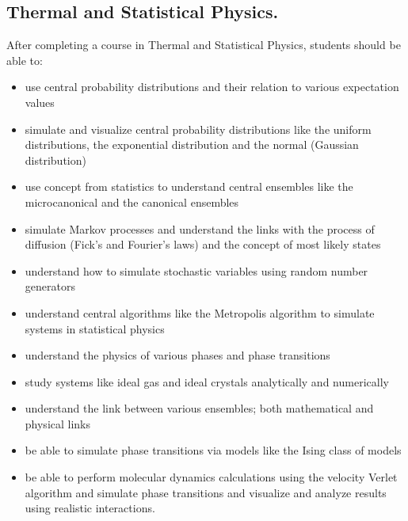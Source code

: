 \documentclass[graybox,envcountchap,sectrefs]{svmult}
\begin{document}
\subsection{Thermal and Statistical Physics.}
After completing a course in Thermal and Statistical Physics, students should be able to:
\begin{itemize}
\item use central probability distributions and their relation to various expectation values

\item simulate and visualize central probability distributions like the uniform distributions, the exponential distribution and the normal (Gaussian distribution)

\item use concept from statistics to understand central ensembles like the microcanonical and the canonical ensembles

\item simulate Markov processes and understand the links with the process of diffusion (Fick's and Fourier's laws) and the concept of most likely states

\item understand how to simulate stochastic variables using random number generators

\item understand central algorithms like the Metropolis algorithm to simulate systems in statistical physics

\item understand the physics of various phases and phase transitions

\item study systems like ideal gas and ideal crystals analytically and numerically

\item understand the link between various ensembles; both mathematical and physical links

\item be able to simulate phase transitions via models like the Ising class of models

\item be able to perform molecular dynamics calculations using the velocity Verlet algorithm and simulate phase transitions and visualize and analyze results using realistic interactions.
\end{itemize}
\end{document}
